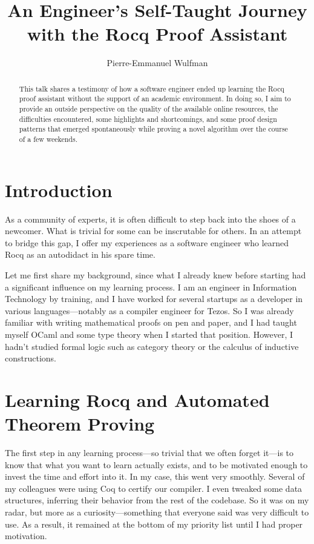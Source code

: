 \documentclass[11pt]{article}
\title{An Engineer's Self-Taught Journey with the Rocq Proof Assistant}
\author[1]{Pierre-Emmanuel Wulfman}
\date{}
\affil[1]{Graduate School of Mathematics, Nagoya University, Japan}
\begin{document}
\maketitle

\begin{abstract}
   This talk shares a testimony of how a software engineer ended up learning the Rocq proof assistant without the support of an academic environment. In doing so, I aim to provide an outside perspective on the quality of the available online resources, the difficulties encountered, some highlights and shortcomings, and some proof design patterns that emerged spontaneously while proving a novel algorithm over the course of a few weekends.
\end{abstract}

\section{Introduction}
As a community of experts, it is often difficult to step back into the shoes of a newcomer. What is trivial for some can be inscrutable for others. In an attempt to bridge this gap, I offer my experiences as a software engineer who learned Rocq as an autodidact in his spare time.

Let me first share my background, since what I already knew before starting had a significant influence on my learning process. I am an engineer in Information Technology by training, and I have worked for several startups as a developer in various languages---notably as a compiler engineer for Tezos. So I was already familiar with writing mathematical proofs on pen and paper, and I had taught myself OCaml and some type theory when I started that position. However, I hadn't studied formal logic such as category theory or the calculus of inductive constructions.

\section{Learning Rocq and Automated Theorem Proving}
The first step in any learning process---so trivial that we often forget it---is to know that what you want to learn actually exists, and to be motivated enough to invest the time and effort into it. In my case, this went very smoothly. Several of my colleagues were using Coq to certify our compiler. I even tweaked some data structures, inferring their behavior from the rest of the codebase. So it was on my radar, but more as a curiosity---something that everyone said was very difficult to use. As a result, it remained at the bottom of my priority list until I had proper motivation.
\end{document}
